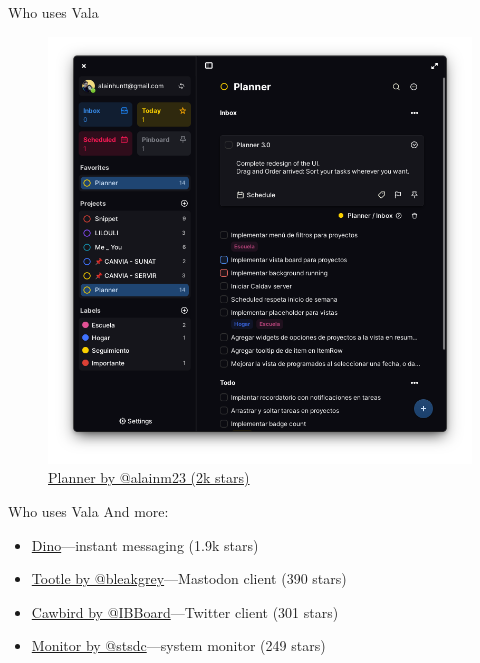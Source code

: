 \documentclass[t]{beamer}
\begin{document}
\begin{frame}[c]{Who uses Vala}
\begin{figure}
    \begin{center}
        \includegraphics[scale=.25]{res/planner.png}
        \caption{\href{https://github.com/alainm23/planner}{Planner by @alainm23 (2k stars)}}
    \end{center}
\end{figure}
\end{frame}

\begin{frame}[c]{Who uses Vala}
And more:

\begin{itemize}
    \item \href{https://github.com/dino/dino}{Dino}---instant messaging (1.9k stars)
    \item \href{https://github.com/bleakgrey}{Tootle by @bleakgrey}---Mastodon client (390 stars)
    \item \href{https://github.com/IBBoard/cawbird}{Cawbird by @IBBoard}---Twitter client (301 stars)
    \item \href{https://github.com/stsdc/monitor}{Monitor by @stsdc}---system monitor (249 stars)
\end{itemize}
\end{frame}
\end{document}
